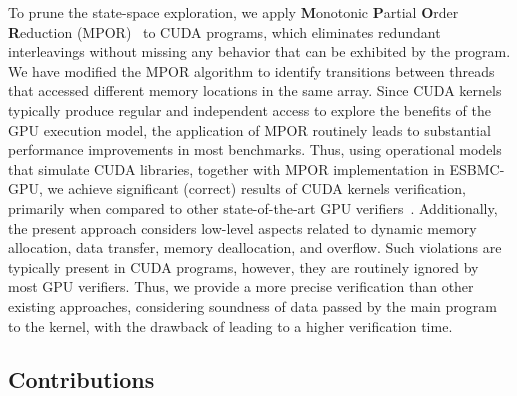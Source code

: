 \documentclass[times, doublespace]{cpeauth}
\begin{document}
To prune the state-space exploration, we apply {\bf M}onotonic {\bf P}artial {\bf O}rder {\bf R}eduction (MPOR)~\cite{KahlonWG09} to CUDA programs, which eliminates redundant interleavings without missing any behavior that can be exhibited by the program. We have modified the MPOR algorithm to identify transitions between threads that accessed different memory locations in the same array. Since CUDA kernels typically produce regular and independent access to explore the benefits of the GPU execution model, the application of MPOR routinely leads to substantial performance improvements in most benchmarks. Thus, using operational models that simulate CUDA libraries, together with MPOR implementation in ESBMC-GPU, we achieve significant (correct) results of CUDA kernels verification, primarily when compared to other state-of-the-art GPU verifiers~\cite{betts:2012,Li:2012,Li:2010,civl:2015}. Additionally, the present approach considers low-level aspects related to dynamic memory allocation, data transfer, memory deallocation, and overflow. Such violations are typically present in CUDA programs, however, they are routinely ignored by most GPU verifiers. Thus, we provide a more precise verification than other existing approaches, considering soundness of data passed by the main program to the kernel, with the drawback of leading to a higher verification time.

\subsection{Contributions}
\vspace{-2pt}
\label{sec:contributions}
\end{document}
